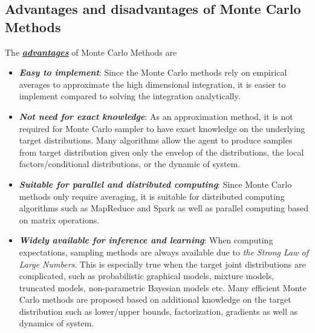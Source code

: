 \documentclass[11pt]{article}
\begin{document}
\subsection{Advantages and disadvantages of Monte Carlo Methods}
The \underline{\textit{\textbf{advantages}}} of Monte Carlo Methods are
\begin{itemize}
\item \textbf{\emph{Easy to implement}}: Since the Monte Carlo methods rely on empirical averages to approximate the high dimensional integration, it is easier to implement compared to solving the integration analytically. 

\item \textbf{\emph{Not need for exact knowledge}}: As an approximation method, it is not required for Monte Carlo sampler to have exact knowledge on the underlying target distributions. Many algorithms allow the agent to produce samples from target distribution given only the envelop of the distributions, the local factors/conditional distributions, or the dynamic of system. 

\item \textbf{\emph{Suitable for parallel and distributed computing}}: Since Monte Carlo methods only require averaging, it is suitable for distributed computing algorithms such as MapReduce and Spark as well as parallel computing based on matrix operations. 

\item \textbf{\emph{Widely available for inference and learning}}: When computing expectations, sampling methods are always available due to \emph{the Strong Law of Large Numbers}. This is especially true when the target joint distributions  are complicated, such as probabilistic graphical models, mixture models, truncated models, non-parametric Bayesian models etc. Many efficient Monte Carlo methods are proposed based on additional knowledge on the target distribution such as lower/upper bounds, factorization, gradients as well as dynamics of system.  %
\end{itemize}
\end{document}

